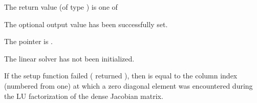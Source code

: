 {
  The return value  (of type ) is one of
  \begin{args}
  \item[\Id{KINDENSE\_SUCCESS}] 
    The optional output value has been successfully set.
  \item[\Id{KINDENSE\_MEM\_NULL}]
    The  pointer is .
  \item[\Id{KINDENSE\_LMEM\_NULL}]
    The {\kindense} linear solver has not been initialized.
  \end{args}
}
{
  If the {\kindense} setup function failed ( returned ),
  then  is equal to the column index (numbered from one) at which
  a zero diagonal element was encountered during the LU factorization of the 
  dense Jacobian matrix.
}

